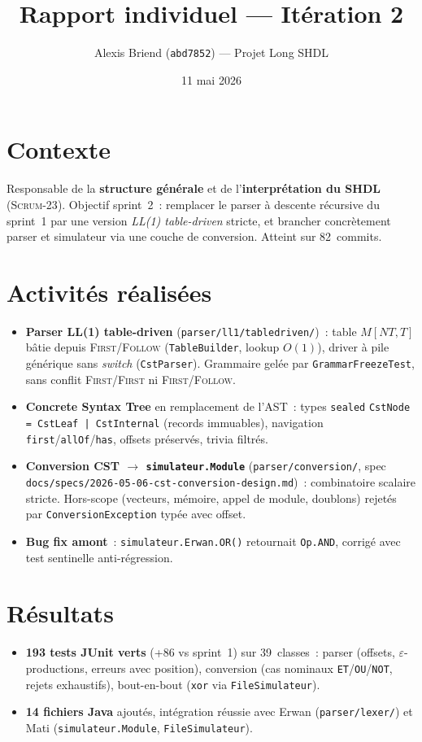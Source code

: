 \documentclass[11pt,a4paper]{article}
\title{\vspace{-1.5cm}Rapport individuel --- It\'eration 2}
\author{Alexis Briend (\texttt{abd7852}) --- Projet Long SHDL}
\date{11 mai 2026}
\begin{document}
\maketitle
\vspace{-2em}

\section*{Contexte}
Responsable de la \textbf{structure g\'en\'erale} et de l'\textbf{interpr\'etation du SHDL} (\textsc{Scrum-23}). Objectif sprint~2~: remplacer le parser \`a descente r\'ecursive du sprint~1 par une version \emph{LL(1) table-driven} stricte, et brancher concr\`etement parser et simulateur via une couche de conversion. Atteint sur 82~commits.

\section*{Activit\'es r\'ealis\'ees}
\begin{itemize}
  \item \textbf{Parser LL(1) table-driven} (\texttt{parser/ll1/tabledriven/})~: table $M[NT,T]$ b\^atie depuis \textsc{First}/\textsc{Follow} (\texttt{TableBuilder}, lookup $O(1)$), driver \`a pile g\'en\'erique sans \emph{switch} (\texttt{CstParser}). Grammaire gel\'ee par \texttt{GrammarFreezeTest}, sans conflit \textsc{First}/\textsc{First} ni \textsc{First}/\textsc{Follow}.
  \item \textbf{Concrete Syntax Tree} en remplacement de l'AST~: types \texttt{sealed} \texttt{CstNode = CstLeaf | CstInternal} (records immuables), navigation \texttt{first}/\texttt{allOf}/\texttt{has}, offsets pr\'eserv\'es, trivia filtr\'es.
  \item \textbf{Conversion CST $\to$ \texttt{simulateur.Module}} (\texttt{parser/conversion/}, spec \texttt{docs/specs/2026-05-06-cst-conversion-design.md})~: combinatoire scalaire stricte. Hors-scope (vecteurs, m\'emoire, appel de module, doublons) rejet\'es par \texttt{ConversionException} typ\'ee avec offset.
  \item \textbf{Bug fix amont}~: \texttt{simulateur.Erwan.OR()} retournait \texttt{Op.AND}, corrig\'e avec test sentinelle anti-r\'egression.
\end{itemize}

\section*{R\'esultats}
\begin{itemize}
  \item \textbf{193 tests JUnit verts} (+86 vs sprint~1) sur 39~classes~: parser (offsets, $\varepsilon$-productions, erreurs avec position), conversion (cas nominaux \texttt{ET}/\texttt{OU}/\texttt{NOT}, rejets exhaustifs), bout-en-bout (\texttt{xor} via \texttt{FileSimulateur}).
  \item \textbf{14 fichiers Java} ajout\'es, int\'egration r\'eussie avec Erwan (\texttt{parser/lexer/}) et Mati (\texttt{simulateur.Module}, \texttt{FileSimulateur}).
\end{itemize}
\end{document}
